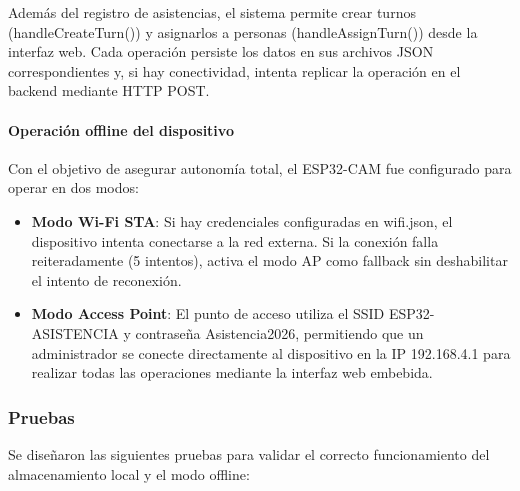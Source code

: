 Además del registro de asistencias, el sistema permite crear turnos (handleCreateTurn()) y asignarlos a personas (handleAssignTurn()) desde la interfaz web. Cada operación persiste los datos en sus archivos JSON correspondientes y, si hay conectividad, intenta replicar la operación en el backend mediante HTTP POST.

\paragraph{Operación offline del dispositivo}

Con el objetivo de asegurar autonomía total, el ESP32-CAM fue configurado para operar en dos modos:

\begin{itemize}
    \item \textbf{Modo Wi-Fi STA}: Si hay credenciales configuradas en wifi.json, el dispositivo intenta conectarse a la red externa. Si la conexión falla reiteradamente (5 intentos), activa el modo AP como fallback sin deshabilitar el intento de reconexión.
    \item \textbf{Modo Access Point}: El punto de acceso utiliza el SSID ESP32-ASISTENCIA y contraseña Asistencia2026, permitiendo que un administrador se conecte directamente al dispositivo en la IP 192.168.4.1 para realizar todas las operaciones mediante la interfaz web embebida.
\end{itemize}

\subsubsection{Pruebas}

Se diseñaron las siguientes pruebas para validar el correcto funcionamiento del almacenamiento local y el modo offline:

